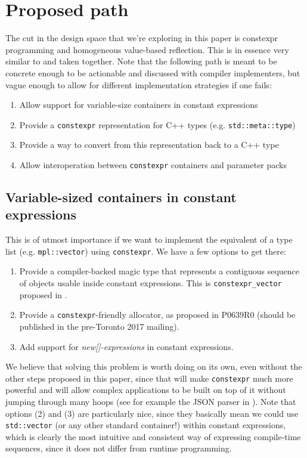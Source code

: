 \documentclass{wg21}
\newcommand{\cc}[1]{\texttt{#1}}
\begin{document}
\section{Proposed path}
The cut in the design space that we're exploring in this paper is constexpr
programming and homogeneous value-based reflection. This is in essence very
similar to \cite{P0598} and \cite{P0597} taken together. Note that the following
path is meant to be concrete enough to be actionable and discussed with compiler
implementers, but vague enough to allow for different implementation strategies
if one fails:

\begin{enumerate}
  \item Allow support for variable-size containers in constant expressions
  \item Provide a \cc{constexpr} representation for C++ types (e.g. \cc{std::meta::type})
  \item Provide a way to convert from this representation back to a C++ type
  \item Allow interoperation between \cc{constexpr} containers and parameter packs
\end{enumerate}


\subsection{Variable-sized containers in constant expressions}
This is of utmost importance if we want to implement the equivalent of a type
list (e.g. \cc{mpl::vector}) using \cc{constexpr}. We have a few options to get
there:

\begin{enumerate}
  \item Provide a compiler-backed magic type that represents a contiguous
        sequence of objects usable inside constant expressions. This is
        \cc{constexpr_vector} proposed in \cite{P0597}.
  \item Provide a \cc{constexpr}-friendly allocator, as proposed in P0639R0
        (should be published in the pre-Toronto 2017 mailing).
  \item Add support for \textit{new[]-expressions} in constant expressions.
\end{enumerate}

We believe that solving this problem is worth doing on its own, even without
the other steps proposed in this paper, since that will make \cc{constexpr}
much more powerful and will allow complex applications to be built on top of
it without jumping through many hoops (see for example the JSON parser in
\cite{cppnow_constexpr}). Note that options (2) and (3) are particularly nice,
since they basically mean we could use \cc{std::vector} (or any other standard
container!) within constant expressions, which is clearly the most intuitive
and consistent way of expressing compile-time sequences, since it does not
differ from runtime programming.
\end{document}
